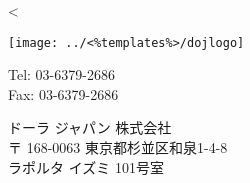 \parbox[t]{.45\textwidth}{
\vspace{0.3cm}
<%
}
\parbox[t]{.48\textwidth}{

\parbox[t]{.30\textwidth}{
\vspace{0.0cm}
\texttt{[image: ../<\%templates\%>/dojlogo]} \\
}
\parbox[t]{.17\textwidth}{
\vspace{1.0cm}
     \small Tel: 03-6379-2686 \\
     \small Fax: 03-6379-2686
}

\parbox[t]{.47\textwidth}{
	ドーラ ジャパン 株式会社 \\
	〒 168-0063 東京都杉並区和泉1-4-8 \\
	ラポルタ イズミ 101号室 \\
}

}
